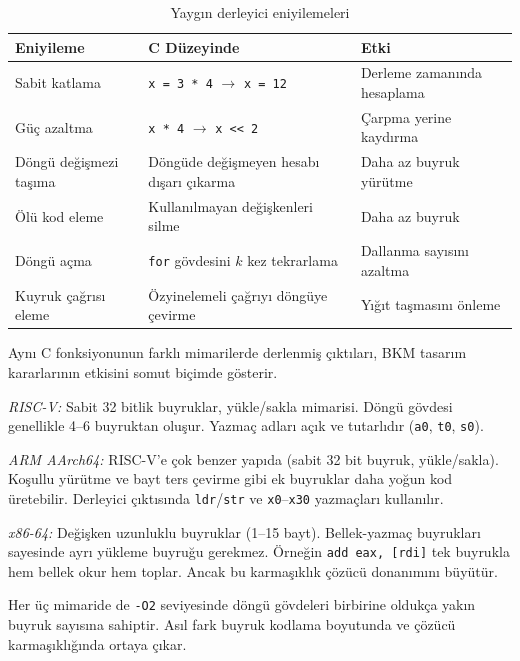 \begin{table}[H]
\centering
\caption[Yaygın derleyici eniyilemeleri]{Yaygın derleyici eniyilemeleri}
\label{tab:derleyici-eniyilemeleri}
\small
\begin{tabularx}{\textwidth}{l X X}
\toprule
\textbf{Eniyileme} & \textbf{C Düzeyinde} & \textbf{Etki} \\
\midrule
Sabit katlama & \texttt{x = 3 * 4} $\rightarrow$ \texttt{x = 12} & Derleme zamanında hesaplama \\
Güç azaltma & \texttt{x * 4} $\rightarrow$ \texttt{x << 2} & Çarpma yerine kaydırma \\
Döngü değişmezi taşıma & Döngüde değişmeyen hesabı dışarı çıkarma & Daha az buyruk yürütme \\
Ölü kod eleme & Kullanılmayan değişkenleri silme & Daha az buyruk \\
Döngü açma & \texttt{for} gövdesini $k$ kez tekrarlama & Dallanma sayısını azaltma \\
Kuyruk çağrısı eleme & Özyinelemeli çağrıyı döngüye çevirme & Yığıt taşmasını önleme \\
\bottomrule
\end{tabularx}
\end{table}

\begin{karsilastirma}
Aynı C fonksiyonunun farklı mimarilerde derlenmiş çıktıları, BKM tasarım kararlarının etkisini somut biçimde gösterir.

\emph{RISC-V:} Sabit 32 bitlik buyruklar, yükle/sakla mimarisi. Döngü gövdesi genellikle 4--6 buyruktan oluşur. Yazmaç adları açık ve tutarlıdır (\texttt{a0}, \texttt{t0}, \texttt{s0}).

\emph{ARM AArch64:} RISC-V'e çok benzer yapıda (sabit 32 bit buyruk, yükle/sakla). Koşullu yürütme ve bayt ters çevirme gibi ek buyruklar daha yoğun kod üretebilir. Derleyici çıktısında \texttt{ldr}/\texttt{str} ve \texttt{x0}--\texttt{x30} yazmaçları kullanılır.

\emph{x86-64:} Değişken uzunluklu buyruklar (1--15 bayt). Bellek-yazmaç buyrukları sayesinde ayrı yükleme buyruğu gerekmez. Örneğin \texttt{add eax, [rdi]} tek buyrukla hem bellek okur hem toplar. Ancak bu karmaşıklık çözücü donanımını büyütür.

Her üç mimaride de \texttt{-O2} seviyesinde döngü gövdeleri birbirine oldukça yakın buyruk sayısına sahiptir. Asıl fark buyruk kodlama boyutunda ve çözücü karmaşıklığında ortaya çıkar.
\end{karsilastirma}

